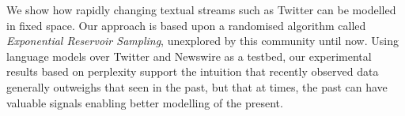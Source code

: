 We show how rapidly changing textual streams such as Twitter can be modelled in fixed space.  Our approach is based upon a randomised algorithm called {\em Exponential Reservoir Sampling}, unexplored by this community until now.  Using language models over Twitter and Newswire as a testbed, our experimental results based on perplexity support the intuition that recently observed data generally outweighs that seen in the past, but that at times, the past can have valuable signals enabling better modelling of the present.
